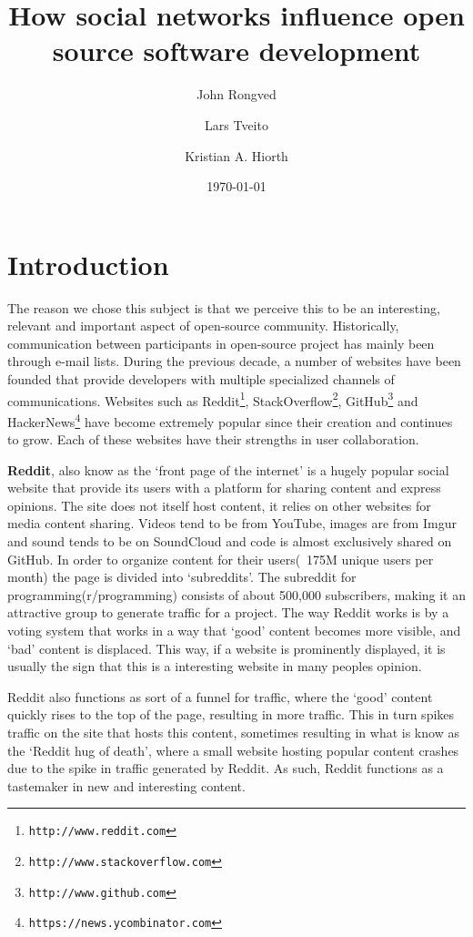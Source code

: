 \documentclass[a4paper,11pt]{scrartcl}
\title{How social networks influence open source software development}
\date{\today}
\author{
  John Rongved\\
  \and
  Lars Tveito \\
  \and
  Kristian A. Hiorth
  }
\begin{document}
\maketitle

\section{Introduction}

The reason we chose this subject is that we perceive this to be an
interesting, relevant and important aspect of open-source
community. Historically, communication between participants in open-source
project has mainly been through e-mail lists. During the previous decade, a
number of websites have been founded that provide developers with multiple
specialized channels of communications. Websites such as
Reddit\footnote{\texttt{http://www.reddit.com}},
StackOverflow\footnote{\texttt{http://www.stackoverflow.com}},
GitHub\footnote{\texttt{http://www.github.com}} and
HackerNews\footnote{\texttt{https://news.ycombinator.com}} have become
extremely popular since their creation and continues to grow. Each of these
websites have their strengths in user collaboration.


\textbf{Reddit}, also know as the ‘front page of the internet’ is a hugely
popular social website that provide its users with a platform for sharing
content and express opinions. The site does not itself host content, it
relies on other websites for media content sharing. Videos tend to be from
YouTube, images are from Imgur and sound tends to be on SoundCloud and code
is almost exclusively shared on GitHub. In order to organize content for
their users(~175M unique users per month) the page is divided into
‘subreddits’. The subreddit for programming(r/programming) consists of about
500,000 subscribers, making it an attractive group to generate traffic for a
project. The way Reddit works is by a voting system that works in a way that
‘good’ content becomes more visible, and ‘bad’ content is displaced. This
way, if a website is prominently displayed, it is usually the sign that this
is a interesting website in many peoples opinion.


Reddit also functions as sort of a funnel for traffic, where the ‘good’
content quickly rises to the top of the page, resulting in more
traffic. This in turn spikes traffic on the site that hosts this content,
sometimes resulting in what is know as the ‘Reddit hug of death’, where a
small website hosting popular content crashes due to the spike in traffic
generated by Reddit. As such, Reddit functions as a tastemaker in new and
interesting content.
\end{document}
